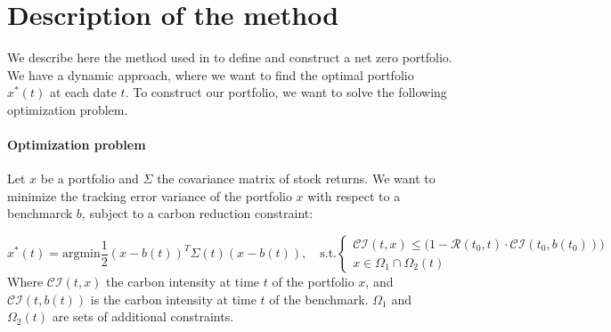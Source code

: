\section{Description of the method}
We describe here the method used in \citep{barahhou2022netzero} to define and construct a net zero portfolio. We have a dynamic approach, where we want to find the optimal portfolio $x^*(t)$ at each date $t$.
To construct our portfolio, we want to solve the following optimization problem.

\paragraph{Optimization problem}
Let $x$ be a portfolio and $\Sigma$ the covariance matrix of stock returns. We want to minimize the tracking error variance of the portfolio $x$ with respect to a benchmarck $b$, subject to a carbon reduction constraint:

\begin{equation}
    x^*(t) = 
    \text{argmin} \frac{1}{2}(x - b(t))^T \Sigma (t)(x - b(t)), \quad
    \text{s.t.} 
    \begin{cases}
        \mathcal{CI}(t, x) \leq \big(1 - \mathcal{R}(t_0, t) \cdot \mathcal{CI}(t_0, b(t_0))\big) \\
        x \in \Omega_1\cap \Omega_2(t)
    \end{cases}
\end{equation}
Where $\mathcal{CI}(t, x)$ the carbon intensity at time $t$ of the portfolio $x$, and $\mathcal{CI}(t, b(t))$ is the carbon intensity at time $t$ of the benchmark. $\Omega_1$ and $\Omega_2(t)$ are sets of additional constraints. 
